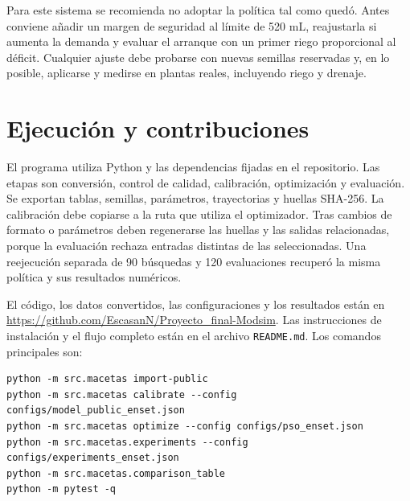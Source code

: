 \documentclass[12pt]{article}
\begin{document}
Para este sistema se recomienda no adoptar la política tal como quedó. Antes conviene añadir un margen de seguridad al límite de 520 mL, reajustarla si aumenta la demanda y evaluar el arranque con un primer riego proporcional al déficit. Cualquier ajuste debe probarse con nuevas semillas reservadas y, en lo posible, aplicarse y medirse en plantas reales, incluyendo riego y drenaje.

\section{Ejecución y contribuciones}

El programa utiliza Python y las dependencias fijadas en el repositorio. Las etapas son conversión, control de calidad, calibración, optimización y evaluación. Se exportan tablas, semillas, parámetros, trayectorias y huellas SHA-256. La calibración debe copiarse a la ruta que utiliza el optimizador. Tras cambios de formato o parámetros deben regenerarse las huellas y las salidas relacionadas, porque la evaluación rechaza entradas distintas de las seleccionadas. Una reejecución separada de 90 búsquedas y 120 evaluaciones recuperó la misma política y sus resultados numéricos.

El código, los datos convertidos, las configuraciones y los resultados están en \url{https://github.com/EscasanN/Proyecto_final-Modsim}. Las instrucciones de instalación y el flujo completo están en el archivo \texttt{README.md}. Los comandos principales son:

{\small
\begin{verbatim}
python -m src.macetas import-public
python -m src.macetas calibrate --config configs/model_public_enset.json
python -m src.macetas optimize --config configs/pso_enset.json
python -m src.macetas.experiments --config configs/experiments_enset.json
python -m src.macetas.comparison_table
python -m pytest -q
\end{verbatim}
}
\end{document}
